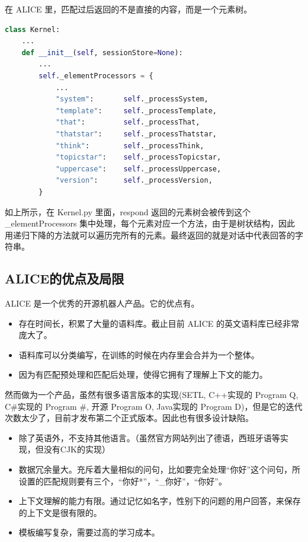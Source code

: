 \documentclass[bachelor,winfonts]{jnuthesis}
\begin{document}
在 ALICE 里，匹配过后返回的不是直接的内容，而是一个元素树。

\begin{lstlisting}[language=Python]
class Kernel:
    ...
    def __init__(self, sessionStore=None):
        ...
        self._elementProcessors = {
            ...
            "system":       self._processSystem,
            "template":     self._processTemplate,
            "that":         self._processThat,
            "thatstar":     self._processThatstar,
            "think":        self._processThink,
            "topicstar":    self._processTopicstar,
            "uppercase":    self._processUppercase,
            "version":      self._processVersion,
        }
\end{lstlisting}

如上所示，在 Kernel.py 里面，respond 返回的元素树会被传到这个 \_elementProcessors 集中处理，每个元素对应一个方法，由于是树状结构，因此用递归下降的方法就可以遍历完所有的元素。最终返回的就是对话中代表回答的字符串。



\subsection{ALICE的优点及局限}
ALICE 是一个优秀的开源机器人产品\cite{杨斌艳2003人与机器的对话}。它的优点有。

\begin{itemize}
\item 存在时间长，积累了大量的语料库。截止目前 ALICE 的英文语料库已经非常庞大了。
\item 语料库可以分类编写，在训练的时候在内存里会合并为一个整体。
\item 因为有匹配预处理和匹配后处理，使得它拥有了理解上下文的能力。
\end{itemize}

然而做为一个产品，虽然有很多语言版本的实现(SETL, C++实现的 Program Q, C\#实现的 Program \#, 开源 Program O, Java实现的 Program D)，但是它的迭代次数太少了，目前才发布第二个正式版本。因此也有很多设计缺陷。

\begin{itemize}
\item 除了英语外，不支持其他语言。（虽然官方网站列出了德语，西班牙语等实现，但没有CJK的实现）
\item 数据冗余量大。充斥着大量相似的问句，比如要完全处理“你好”这个问句，所设置的匹配规则要有三个，“你好*”，“\_你好”，“你好”。
\item 上下文理解的能力有限。通过记忆如名字，性别下的问题的用户回答，来保存的上下文是很有限的。
\item 模板编写复杂，需要过高的学习成本。
\end{itemize}
\end{document}

